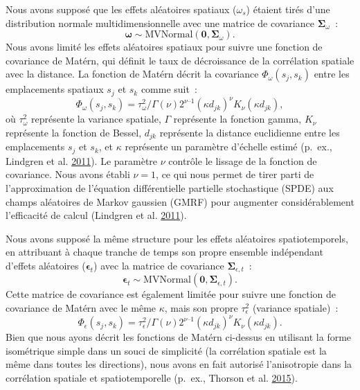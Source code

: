 \documentclass[11pt]{book}
\begin{document}
Nous avons supposé que les effets aléatoires spatiaux (\(\omega_s\)) étaient tirés d'une distribution normale multidimensionnelle avec une matrice de covariance \(\bm{\Sigma}_\omega\)~:
\begin{equation}
\bm{\omega} \sim \mathrm{MVNormal} \left( \bm{0}, \bm{\Sigma}_\omega \right).
\end{equation}
Nous avons limité les effets aléatoires spatiaux pour suivre une fonction de covariance de \mbox{Mat\'ern}, qui définit le taux de décroissance de la corrélation spatiale avec la distance. La fonction de \mbox{Mat\'ern} décrit la covariance \(\Phi_\omega \left( s_j, s_k \right)\) entre les emplacements spatiaux \(s_j\) et \(s_k\) comme suit~:
\begin{equation}
\Phi_\omega\left( s_j,s_k \right) = \tau_\omega^2/\Gamma(\nu)2^{\nu – 1}
    (\kappa d_{jk})^\nu K_\nu \left( \kappa d_{jk} \right),
\end{equation}
où \(\tau_\omega^2\) représente la variance spatiale, \(\Gamma\) représente la fonction gamma, \(K_\nu\) représente la fonction de Bessel, \(d_{jk}\) représente la distance euclidienne entre les emplacements \(s_j\) et \(s_k\), et \(\kappa\) représente un paramètre d'échelle estimé (p.~ex., Lindgren et al. \protect\hyperlink{ref-lindgren2011}{2011}). Le paramètre \(\nu\) contrôle le lissage de la fonction de covariance. Nous avons établi \(\nu = 1\), ce qui nous permet de tirer parti de l'approximation de l'équation différentielle partielle stochastique (SPDE) aux champs aléatoires de Markov gaussien (GMRF) pour augmenter considérablement l'efficacité de calcul (Lindgren et al. \protect\hyperlink{ref-lindgren2011}{2011}).

Nous avons supposé la même structure pour les effets aléatoires spatiotemporels, en attribuant à chaque tranche de temps son propre ensemble indépendant d'effets aléatoires (\(\bm{\epsilon}_t\)) avec la matrice de covariance \(\bm{\Sigma}_{\epsilon,t}\)~:
\begin{equation}
\bm{\epsilon}_t \sim \mathrm{MVNormal} \left( \bm{0}, \bm{\Sigma}_{\epsilon,t} \right).
\end{equation}
Cette matrice de covariance est également limitée pour suivre une fonction de covariance de \mbox{Mat\'ern} avec le même \(\kappa\), mais son propre \(\tau_\epsilon^2\) (variance spatiale)~:
\begin{equation}
\Phi_\epsilon\left( s_j,s_k \right) = \tau_\epsilon^2/\Gamma(\nu)2^{\nu – 1}
    (\kappa d_{jk})^\nu K_\nu \left( \kappa d_{jk} \right).
\end{equation}
Bien que nous ayons décrit les fonctions de \mbox{Mat\'ern} ci-dessus en utilisant la forme isométrique simple dans un souci de simplicité (la corrélation spatiale est la même dans toutes les directions), nous avons en fait autorisé l'anisotropie dans la corrélation spatiale et spatiotemporelle (p.~ex., Thorson et al. \protect\hyperlink{ref-thorson2015}{2015}).
\end{document}
